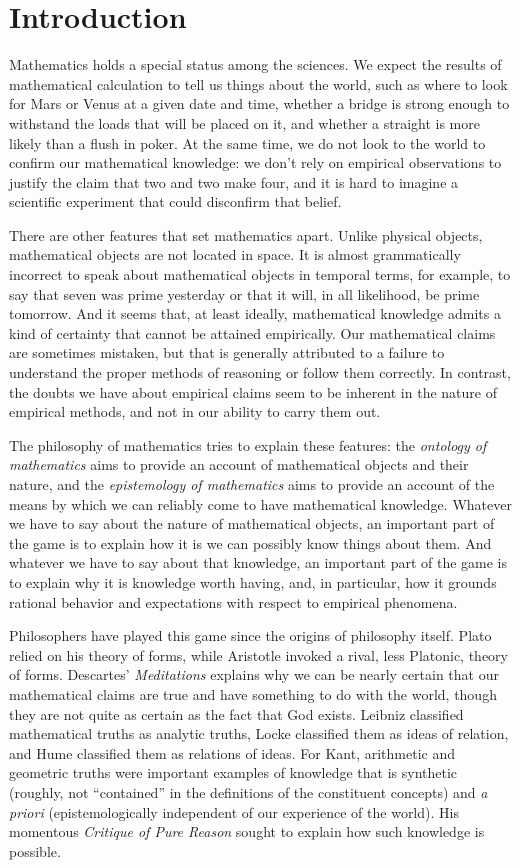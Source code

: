 \documentclass[12pt]{article}
\begin{document}
\section{Introduction}

Mathematics holds a special status among the sciences. We expect the results of mathematical calculation to tell us things about the world, such as where to look for Mars or Venus at a given date and time, whether a bridge is strong enough to withstand the loads that will be placed on it, and whether a straight is more likely than a flush in poker. At the same time, we do not look to the world to confirm our mathematical knowledge: we don't rely on empirical observations to justify the claim that two and two make four, and it is hard to imagine a scientific experiment that could disconfirm that belief. 

There are other features that set mathematics apart. Unlike physical objects, mathematical objects are not located in space. It is almost grammatically incorrect to speak about mathematical objects in temporal terms, for example, to say that seven was prime yesterday or that it will, in all likelihood, be prime tomorrow. And it seems that, at least ideally, mathematical knowledge admits a kind of certainty that cannot be attained empirically. Our mathematical claims are sometimes mistaken, but that is generally attributed to a failure to understand the proper methods of reasoning or follow them correctly. In contrast, the doubts we have about empirical claims seem to be inherent in the nature of empirical methods, and not in our ability to carry them out.

The philosophy of mathematics tries to explain these features: the \emph{ontology of mathematics} aims to provide an account of mathematical objects and their nature, and the \emph{epistemology of mathematics} aims to provide an account of the means by which we can reliably come to have mathematical knowledge. Whatever we have to say about the nature of mathematical objects, an important part of the game is to explain how it is we can possibly know things about them. And whatever we have to say about that knowledge, an important part of the game is to explain why it is knowledge worth having, and, in particular, how it grounds rational behavior and expectations with respect to empirical phenomena.

Philosophers have played this game since the origins of philosophy itself. Plato relied on his theory of forms, while Aristotle invoked a rival, less Platonic, theory of forms. Descartes' \emph{Meditations} explains why we can be nearly certain that our mathematical claims are true and have something to do with the world, though they are not quite as certain as the fact that God exists. Leibniz classified mathematical truths as analytic truths, Locke classified them as ideas of relation, and Hume classified them as relations of ideas. For Kant, arithmetic and geometric truths were important examples of knowledge that is synthetic (roughly, not ``contained'' in the definitions of the constituent concepts) and \emph{a priori} (epistemologically independent of our experience of the world). His momentous \emph{Critique of Pure Reason} sought to explain how such knowledge is possible.
\end{document}
